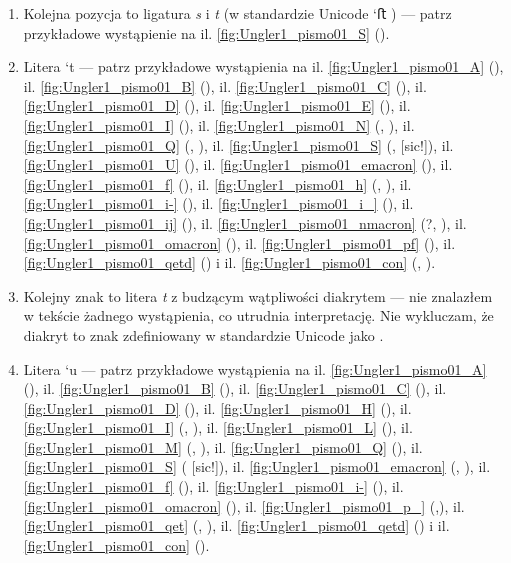 \begin{enumerate}
\begin{enumerate}
\item Kolejna pozycja to ligatura \textit{s} i \textit{t} (w standardzie Unicode
`ﬅ  )
--- patrz przykładowe wystąpienie na
il. \vref{fig:Ungler1_pismo01_S} ().


\item Litera `t --- patrz przykładowe wystąpienia na
    il. \vref{fig:Ungler1_pismo01_A} (),
    il. \vref{fig:Ungler1_pismo01_B} (),
    il. \vref{fig:Ungler1_pismo01_C} (),
      il. \vref{fig:Ungler1_pismo01_D} (),
      il. \vref{fig:Ungler1_pismo01_E} (),
        il. \vref{fig:Ungler1_pismo01_I} (),
    il. \vref{fig:Ungler1_pismo01_N} (, ),
    il. \vref{fig:Ungler1_pismo01_Q} (, ),
    il. \vref{fig:Ungler1_pismo01_S} (,  [sic!]),
  il. \vref{fig:Ungler1_pismo01_U} (),
  il. \vref{fig:Ungler1_pismo01_emacron} (),
  il. \vref{fig:Ungler1_pismo01_f} (),
  il. \vref{fig:Ungler1_pismo01_h} (, ),
  il. \vref{fig:Ungler1_pismo01_i-} (),
il. \vref{fig:Ungler1_pismo01_i_} (),
il. \vref{fig:Ungler1_pismo01_ij} (),
   il. \vref{fig:Ungler1_pismo01_nmacron} (?, ),
   il. \vref{fig:Ungler1_pismo01_omacron} (),
il. \vref{fig:Ungler1_pismo01_pf} (),
 il. \vref{fig:Ungler1_pismo01_qetd} () i
  il. \vref{fig:Ungler1_pismo01_con} (, ).

\item Kolejny znak to litera \textit{t} z budzącym wątpliwości
  diakrytem --- nie znalazłem w tekście żadnego wystąpienia, co
  utrudnia interpretację. Nie wykluczam, że diakryt to znak
  zdefiniowany w standardzie Unicode jako  
  .

\item Litera `u --- patrz przykładowe wystąpienia na
    il. \vref{fig:Ungler1_pismo01_A} (),
il. \vref{fig:Ungler1_pismo01_B} (),
  il. \vref{fig:Ungler1_pismo01_C} (),
  il. \vref{fig:Ungler1_pismo01_D} (),
  il. \vref{fig:Ungler1_pismo01_H} (),
  il. \vref{fig:Ungler1_pismo01_I} (, ),
    il. \vref{fig:Ungler1_pismo01_L} (),
  il. \vref{fig:Ungler1_pismo01_M} (, ),
    il. \vref{fig:Ungler1_pismo01_Q} (),
    il. \vref{fig:Ungler1_pismo01_S} ( [sic!]),
  il. \vref{fig:Ungler1_pismo01_emacron} (, ),
  il. \vref{fig:Ungler1_pismo01_f} (),
  il. \vref{fig:Ungler1_pismo01_i-} (),
   il. \vref{fig:Ungler1_pismo01_omacron} (),
il. \vref{fig:Ungler1_pismo01_p_} (,),
il. \vref{fig:Ungler1_pismo01_qet} (, ),
 il. \vref{fig:Ungler1_pismo01_qetd} () i
  il. \vref{fig:Ungler1_pismo01_con} ().


\end{enumerate}
\end{enumerate}

